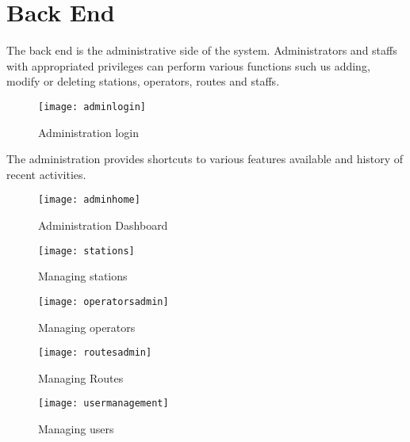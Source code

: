 \section{Back End}
The back end is the administrative side of the system. Administrators and staffs with appropriated privileges can perform various functions such us adding, modify or deleting stations, operators, routes and staffs.
\begin{figure}[H]
	\centering
	\texttt{[image: adminlogin]}
	\caption[Administration login]{Administration login}
	\label{fig:adminlogin}
\end{figure}
The administration provides shortcuts to various features available and history of recent activities.
\begin{figure}[H]
	\centering
	\texttt{[image: adminhome]}
	\caption[Administration dasboard]{Administration Dashboard}
	\label{fig:adminhome}
\end{figure}
\begin{figure}[H]
	\centering
	\texttt{[image: stations]}
	\caption[Managing stations]{Managing stations}
	\label{fig:stations}
\end{figure}
\begin{figure}[H]
	\centering
	\texttt{[image: operatorsadmin]}
	\caption[Managing operators]{Managing operators}
	\label{fig:operatorsadmin}
\end{figure}
\begin{figure}[H]
	\centering
	\texttt{[image: routesadmin]}
	\caption[Managing Routes]{Managing Routes}
	\label{fig:routesadmin}
\end{figure}
\begin{figure}[H]
	\centering
	\texttt{[image: usermanagement]}
	\caption[Managing users]{Managing users}
	\label{fig:usermanagement}
\end{figure}






